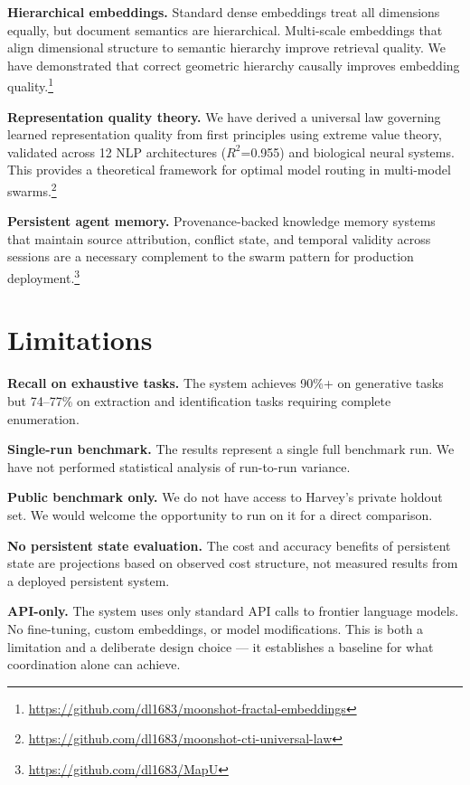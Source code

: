 \documentclass[11pt,a4paper]{article}
\begin{document}
\textbf{Hierarchical embeddings.} Standard dense embeddings treat all dimensions equally, but document semantics are hierarchical. Multi-scale embeddings that align dimensional structure to semantic hierarchy improve retrieval quality. We have demonstrated that correct geometric hierarchy causally improves embedding quality.\footnote{\url{https://github.com/dl1683/moonshot-fractal-embeddings}}

\textbf{Representation quality theory.} We have derived a universal law governing learned representation quality from first principles using extreme value theory, validated across 12 NLP architectures ($R^2$=0.955) and biological neural systems. This provides a theoretical framework for optimal model routing in multi-model swarms.\footnote{\url{https://github.com/dl1683/moonshot-cti-universal-law}}

\textbf{Persistent agent memory.} Provenance-backed knowledge memory systems that maintain source attribution, conflict state, and temporal validity across sessions are a necessary complement to the swarm pattern for production deployment.\footnote{\url{https://github.com/dl1683/MapU}}


\section{Limitations}

\textbf{Recall on exhaustive tasks.} The system achieves 90\%+ on generative tasks but 74--77\% on extraction and identification tasks requiring complete enumeration.

\textbf{Single-run benchmark.} The results represent a single full benchmark run. We have not performed statistical analysis of run-to-run variance.

\textbf{Public benchmark only.} We do not have access to Harvey's private holdout set. We would welcome the opportunity to run on it for a direct comparison.

\textbf{No persistent state evaluation.} The cost and accuracy benefits of persistent state are projections based on observed cost structure, not measured results from a deployed persistent system.

\textbf{API-only.} The system uses only standard API calls to frontier language models. No fine-tuning, custom embeddings, or model modifications. This is both a limitation and a deliberate design choice — it establishes a baseline for what coordination alone can achieve.
\end{document}
